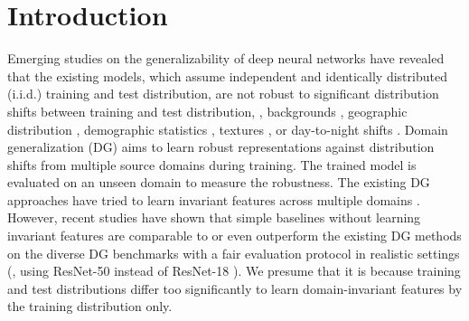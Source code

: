 \section{Introduction}
Emerging studies on the generalizability of deep neural networks have revealed that the existing models, which assume independent and identically distributed (i.i.d.) training and test distribution, are not robust to significant distribution shifts between training and test distribution, \eg, backgrounds \cite{xiao2020background_challenge_bgc}, geographic distribution \cite{de2019does}, demographic statistics \cite{yang2020towards, scimeca2022wcst-ml}, textures \cite{geirhos2019cnn_biased_towards_texture, bahng2019rebias}, or day-to-night shifts \cite{dai2018dark, michaelis2019benchmarking}.
Domain generalization (DG) aims to learn robust representations against distribution shifts from multiple source {domains} during training. The trained model is evaluated on an unseen domain to measure the robustness.
The existing DG approaches have tried to learn invariant features across multiple {domains} \cite{ganin2016dann,arjovsky2019irm,li2018mldg,cha2021swad,sun2016coral,bui2021mdsdi,zhou2021mixstyle}.
However, recent studies \cite{gulrajani2020domainbed, koh2021wilds} have shown that simple baselines without learning invariant features are comparable to or even outperform the existing DG methods on the diverse DG benchmarks with a fair evaluation protocol in realistic settings (\eg, using ResNet-50 instead of ResNet-18 \cite{he2016_cvpr_resnet}).
We presume that it is because training and test distributions differ too significantly to learn domain-invariant features by the training distribution only.

